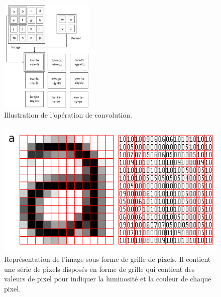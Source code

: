	\begin{figure}[H]%
		\centering
		\includegraphics[width=0.4\textwidth]{images/cnn_kernel}
		\caption[Illustration des calculs effectués dans une opération de convolution.]{Illustration de l'opération de convolution.}
		\label{fig:cnn_kernel}
	\end{figure}
	
		
	
	\begin{figure}[H]%
		\centering
		\includegraphics[width=\textwidth]{images/image_pixel}
		\caption[Représentation de l'image sous forme de grille de pixels.]{Représentation de l'image sous forme de grille de pixels. Il contient une série de pixels disposés en forme de grille qui contient des valeurs de pixel pour indiquer la luminosité et la couleur de chaque pixel.}
		\label{fig:image_pixel}
	\end{figure}

